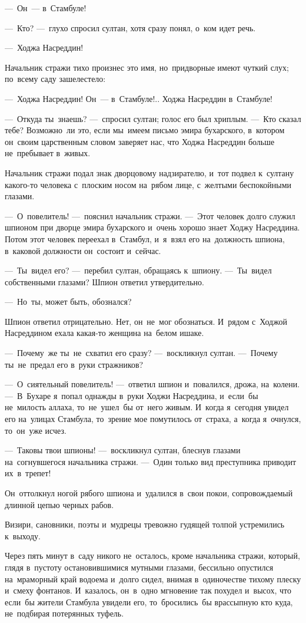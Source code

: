 \documentclass[12pt,a4paper]{book}
\begin{document}
—~Он~— в~Стамбуле!

—~Кто? —~глухо спросил султан, хотя сразу понял, о~ком идет речь.

—~Ходжа Насреддин!

Начальник стражи тихо произнес это имя, но~придворные имеют чуткий слух; по~всему саду зашелестело:

—~Ходжа Насреддин! Он~— в~Стамбуле!.. Ходжа Насреддин в~Стамбуле!

—~Откуда ты~знаешь? —~спросил султан; голос его был хриплым. —~Кто сказал тебе? Возможно~ли это, если мы~имеем письмо эмира бухарского, в~котором он~своим царственным словом заверяет нас, что Ходжа Насреддин больше не~пребывает в~живых.

Начальник стражи подал знак дворцовому надзирателю, и~тот подвел к~султану какого-то человека с~плоским носом на~рябом лице, с~желтыми беспокойными глазами.

—~О~повелитель! —~пояснил начальник стражи. —~Этот человек долго служил шпионом при дворце эмира бухарского и~очень хорошо знает Ходжу Насреддина. Потом этот человек переехал в~Стамбул, и~я~взял его на~должность шпиона, в~каковой должности он~состоит и~сейчас.

—~Ты~видел его? —~перебил султан, обращаясь к~шпиону. —~Ты~видел собственными глазами? Шпион ответил утвердительно.

—~Но~ты, может быть, обознался?

Шпион ответил отрицательно. Нет, он~не~мог обознаться. И~рядом с~Ходжой Насреддином ехала какая-то женщина на~белом ишаке.

—~Почему~же ты~не~схватил его сразу? —~воскликнул султан. —~Почему ты~не~предал его в~руки стражников?

—~О~сиятельный повелитель! —~ответил шпион и~повалился, дрожа, на~колени. —~В~Бухаре я~попал однажды в~руки Ходжи Насреддина, и~если~бы не~милость аллаха, то~не~ушел~бы от~него живым. И~когда я~сегодня увидел его на~улицах Стамбула, то~зрение мое помутилось от~страха, а~когда я~очнулся, то~он~уже исчез.

—~Таковы твои шпионы! —~воскликнул султан, блеснув глазами на~согнувшегося начальника стражи. —~Один только вид преступника приводит их~в~трепет!

Он~оттолкнул ногой рябого шпиона и~удалился в~свои покои, сопровождаемый длинной цепью черных рабов.

Визири, сановники, поэты и~мудрецы тревожно гудящей толпой устремились к~выходу.

Через пять минут в~саду никого не~осталось, кроме начальника стражи, который, глядя в~пустоту остановившимися мутными глазами, бессильно опустился на~мраморный край водоема и~долго сидел, внимая в~одиночестве тихому плеску и~смеху фонтанов. И~казалось, он~в~одно мгновение так похудел и~высох, что если~бы жители Стамбула увидели его, то~бросились~бы врассыпную кто куда, не~подбирая потерянных туфель.
\end{document}
